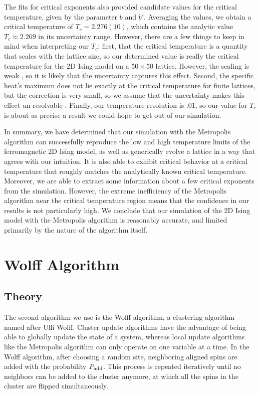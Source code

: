 \documentclass[twocolumn,aps]{revtex4-1} %
\begin{document}
The fits for critical exponents also provided candidate values for the critical temperature, given by the parameter $b$ and $b'$. Averaging the values, we obtain a critical temperature of $T_c = 2.276(10)$, which contains the analytic value $T_c \approx 2.269$ in its uncertainty range. However, there are a few things to keep in mind when interpreting our $T_c$: first, that the critical temperature is a quantity that scales with the lattice size, so our determined value is really the critical temperature for the 2D Ising model on a $50 \times 50$ lattice. However, the scaling is weak \cite{crittemp}, so it is likely that the uncertainty captures this effect. Second, the specific heat's maximum does not lie exactly at the critical temperature for finite lattices, but the correction is very small, so we assume that the uncertainty makes this effect un-resolvable \cite{onsager}. Finally, our temperature resolution is .01, so our value for $T_c$ is about as precise a result we could hope to get out of our simulation.

In summary, we have determined that our simulation with the Metropolis algorithm can successfully reproduce the low and high temperature limits of the ferromagnetic 2D Ising model, as well as generically evolve a lattice in a way that agrees with our intuition. It is also able to exhibit critical behavior at a critical temperature that roughly matches the analytically known critical temperature. Moreover, we are able to extract some information about a few critical exponents from the simulation. However, the extreme inefficiency of the Metropolis algorithm near the critical temperature region means that the confidence in our results is not particularly high. We conclude that our simulation of the 2D Ising model with the Metropolis algorithm is reasonably accurate, and limited primarily by the nature of the algorithm itself.






\section{Wolff Algorithm}
\subsection{Theory}
The second algorithm we use is the Wolff algorithm, a clustering algorithm named after Ulli Wolff. Cluster update algorithms have the advantage of being able to globally update the state of a system, whereas local update algorithms like the Metropolis algorithm can only operate on one variable at a time. In the Wolff algorithm, after choosing a random site, neighboring aligned spins are added with the probability $P_{\rm add}$. This process is repeated iteratively until no neighbors can be added to the cluster anymore, at which all the spins in the cluster are flipped simultaneously. 
\end{document}
